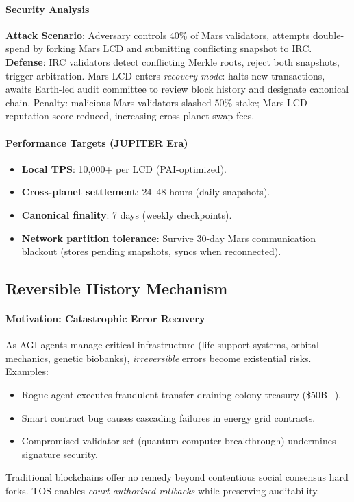 \documentclass[11pt]{article}
\begin{document}
\paragraph{Security Analysis}
\textbf{Attack Scenario}: Adversary controls 40\% of Mars validators, attempts double-spend by forking Mars LCD and submitting conflicting snapshot to IRC.\\
\textbf{Defense}: IRC validators detect conflicting Merkle roots, reject both snapshots, trigger arbitration. Mars LCD enters \emph{recovery mode}: halts new transactions, awaits Earth-led audit committee to review block history and designate canonical chain. Penalty: malicious Mars validators slashed 50\% stake; Mars LCD reputation score reduced, increasing cross-planet swap fees.

\paragraph{Performance Targets (JUPITER Era)}
\begin{itemize}[noitemsep]
  \item \textbf{Local TPS}: 10,000+ per LCD (PAI-optimized).
  \item \textbf{Cross-planet settlement}: 24--48 hours (daily snapshots).
  \item \textbf{Canonical finality}: 7 days (weekly checkpoints).
  \item \textbf{Network partition tolerance}: Survive 30-day Mars communication blackout (stores pending snapshots, syncs when reconnected).
\end{itemize}

\subsection{Reversible History Mechanism}

\paragraph{Motivation: Catastrophic Error Recovery}
As AGI agents manage critical infrastructure (life support systems, orbital mechanics, genetic biobanks), \emph{irreversible} errors become existential risks. Examples:
\begin{itemize}[noitemsep]
  \item Rogue agent executes fraudulent transfer draining colony treasury (\$50B+).
  \item Smart contract bug causes cascading failures in energy grid contracts.
  \item Compromised validator set (quantum computer breakthrough) undermines signature security.
\end{itemize}
Traditional blockchains offer no remedy beyond contentious social consensus hard forks. TOS enables \emph{court-authorised rollbacks} while preserving auditability.
\end{document}

